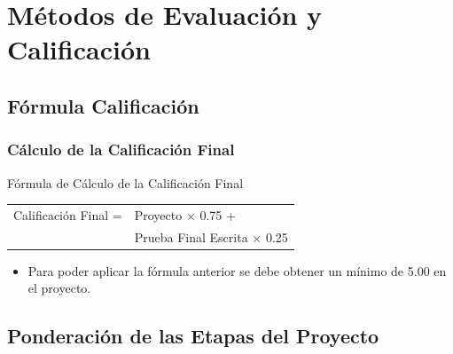 \documentclass[a4paper,t,xcolor=pst,dvips,colortheme]{beamer}
\begin{document}
\section{Métodos de Evaluación y Calificación}

\subsection{Fórmula Calificación}

\begin{frame}[c]
	\frametitle{Cálculo de la Calificación Final}
	\begin{block}{Fórmula de Cálculo de la Calificación Final}
		\begin{center}
        \begin{tabular}{ll}
			Calificación  Final  =  & Proyecto $\times$ 0.75 + \\
                                    & Prueba  Final  Escrita $\times$ 0.25 \\
		\end{tabular}
        \end{center}
	\end{block}
	\begin{itemize}
		\item<2-> Para poder aplicar la fórmula anterior se debe obtener un mínimo de 5.00 en el proyecto.
	\end{itemize}
\end{frame}

\subsection{Ponderación de las Etapas del Proyecto}
\end{document}
